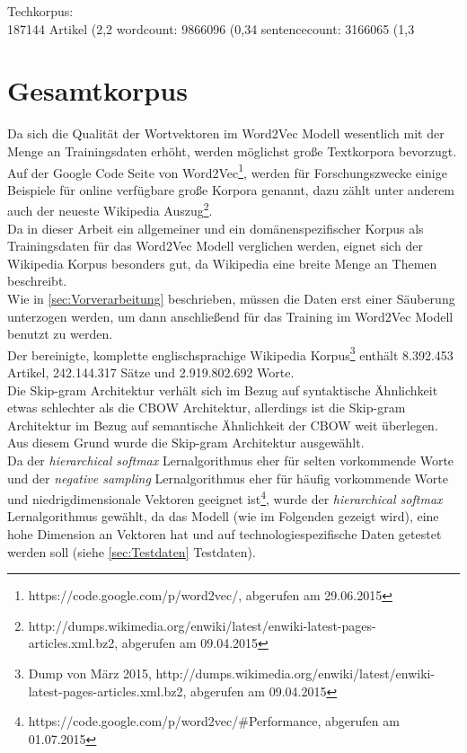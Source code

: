\documentclass[12pt,a4paper]{report}
\begin{document}
	
	Techkorpus:\\
	187144 Artikel (2,2%
	wordcount: 9866096 (0,34%
	sentencecount: 3166065 (1,3%
\fi
	\section{Gesamtkorpus}
	\label{sec:Gesamtkorpus}
	Da sich die Qualität  der Wortvektoren im Word2Vec Modell wesentlich mit der Menge an Trainingsdaten erhöht\citep{DBLP:journals/corr/abs-1301-3781}, werden möglichst große Textkorpora bevorzugt. Auf der Google Code Seite von Word2Vec\footnote{https://code.google.com/p/word2vec/, abgerufen am 29.06.2015}, werden für Forschungszwecke einige Beispiele für online verfügbare große Korpora genannt, dazu zählt unter anderem auch der neueste Wikipedia Auszug\footnote{http://dumps.wikimedia.org/enwiki/latest/enwiki-latest-pages-articles.xml.bz2, abgerufen am 09.04.2015}.\\
	Da in dieser Arbeit ein allgemeiner und ein domänenspezifischer Korpus als Trainingsdaten für das Word2Vec Modell verglichen werden, eignet sich der Wikipedia Korpus besonders gut, da Wikipedia eine breite Menge an Themen beschreibt. \\
	Wie in \ref{sec:Vorverarbeitung} beschrieben, müssen die Daten erst einer Säuberung unterzogen werden, um dann anschließend für das Training im Word2Vec Modell benutzt zu werden.\\
	 Der bereinigte, komplette englischsprachige Wikipedia Korpus\footnote{Dump von März 2015, http://dumps.wikimedia.org/enwiki/latest/enwiki-latest-pages-articles.xml.bz2, abgerufen am 09.04.2015} enthält 8.392.453 Artikel, 242.144.317 Sätze und 2.919.802.692 Worte.\\


Die Skip-gram Architektur verhält sich im Bezug auf syntaktische Ähnlichkeit etwas schlechter als die CBOW Architektur, allerdings ist die Skip-gram Architektur im Bezug auf semantische Ähnlichkeit der CBOW weit überlegen\citep{DBLP:journals/corr/abs-1301-3781}. Aus diesem Grund wurde die Skip-gram Architektur ausgewählt.\\
Da der \textit{hierarchical softmax} Lernalgorithmus eher für selten vorkommende Worte und der \textit{negative sampling} Lernalgorithmus eher für häufig vorkommende Worte und niedrigdimensionale Vektoren geeignet ist\footnote{https://code.google.com/p/word2vec/\#Performance, abgerufen am 01.07.2015}, wurde der  \textit{hierarchical softmax} Lernalgorithmus gewählt, da das Modell (wie im Folgenden gezeigt wird), eine hohe Dimension an Vektoren hat und auf technologiespezifische Daten getestet werden soll (siehe \ref{sec:Testdaten} Testdaten).\\
\end{document}
